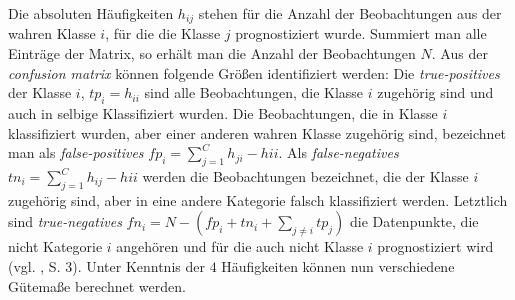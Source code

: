 \documentclass[a4paper,11pt]{article}
\begin{document}
Die absoluten Häufigkeiten $h_{ij}$ stehen für die Anzahl der Beobachtungen aus der wahren Klasse $i$, für die die Klasse $j$ prognostiziert wurde. Summiert man alle Einträge der Matrix, so erhält man die Anzahl der Beobachtungen $N$. Aus der \textit{confusion matrix} können folgende Größen identifiziert werden: Die \textit{true-positives} der Klasse $i$, $tp_i = h_{ii}$ sind alle Beobachtungen, die Klasse $i$ zugehörig sind und auch in selbige Klassifiziert wurden. Die Beobachtungen, die in Klasse $i$ klassifiziert wurden, aber einer anderen wahren Klasse zugehörig sind, bezeichnet man als \textit{false-positives} $fp_i = \sum_{j = 1}^C h_{ji} - h{ii}$. Als \textit{false-negatives} $tn_i = \sum_{j = 1}^C h_{ij} - h{ii}$ werden die Beobachtungen bezeichnet, die der Klasse $i$ zugehörig sind, aber in eine andere Kategorie falsch klassifiziert werden. Letztlich sind \textit{true-negatives} $fn_i = N - (fp_i + tn_i + \sum_{j \neq i} tp_j)$ die Datenpunkte, die nicht Kategorie $i$ angehören und für die auch nicht Klasse $i$ prognostiziert wird (vgl. \cite{sokolova}, S. 3). Unter Kenntnis der $4$ Häufigkeiten können nun verschiedene Gütemaße berechnet werden. 
\end{document}
